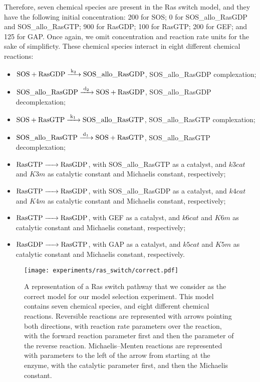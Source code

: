 Therefore, seven chemical species are present in the Ras switch model,
and they have the following initial concentration: 200 for SOS; 0 for
SOS\_allo\_RasGDP and SOS\_allo\_RasGTP; 900 for RasGDP; 100 for RasGTP;
200 for GEF; and 125 for GAP. Once again, we omit concentration and
reaction rate units for the sake of simplificty. These chemical species
interact in eight different chemical reactions:
\begin{itemize}
    \item{$\ce{SOS + RasGDP ->[k2] SOS\_allo\_RasGDP}$}, SOS\_allo\_RasGDP complexation;
    \item{$\ce{SOS\_allo\_RasGDP ->[d2] SOS + RasGDP}$}, SOS\_allo\_RasGDP decomplexation;
    \item{$\ce{SOS + RasGTP ->[k1] SOS\_allo\_RasGTP}$}, SOS\_allo\_RasGTP complexation;
    \item{$\ce{SOS\_allo\_RasGTP ->[d1] SOS + RasGTP}$}, SOS\_allo\_RasGTP decomplexation;
    \item{$\ce{RasGTP -> RasGDP}$}, with SOS\_allo\_RasGTP as a
        catalyst, and $k3cat$ and $K3m$ as catalytic constant and
        Michaelis constant, respectively;
    \item{$\ce{RasGTP -> RasGDP}$}, with SOS\_allo\_RasGDP as a 
        catalyst, and $k4cat$ and $K4m$ as catalytic constant and
        Michaelis constant, respectively;
    \item{$\ce{RasGTP -> RasGDP}$}, with GEF as a catalyst, and
        $k6cat$ and $K6m$ as catalytic constant and Michaelis constant,
        respectively;
    \item{$\ce{RasGDP -> RasGTP}$}, with GAP as a catalyst, and
        $k5cat$ and $K5m$ as catalytic constant and Michaelis constant,
        respectively.
\end{itemize}

\begin{figure}[H]
\begin{center}
\texttt{[image: experiments/ras\_switch/correct.pdf]}
\caption{A representation of a Ras switch pathway that we consider as
    the correct model for our model selection experiment. This model
    contains seven chemical species, and eight different chemical
    reactions. Reversible reactions are represented with arrows pointing
    both directions, with reaction rate parameters over the reaction,
    with the forward reaction parameter first and then the parameter of
    the reverse reaction. Michaelis--Menten reactions are represented
    with parameters to the left of the arrow from starting at the
    enzyme, with the catalytic parameter first, and then the Michaelis
    constant.
}
\label{fig:ras_switch:correct_model}
\end{center}
\end{figure}

